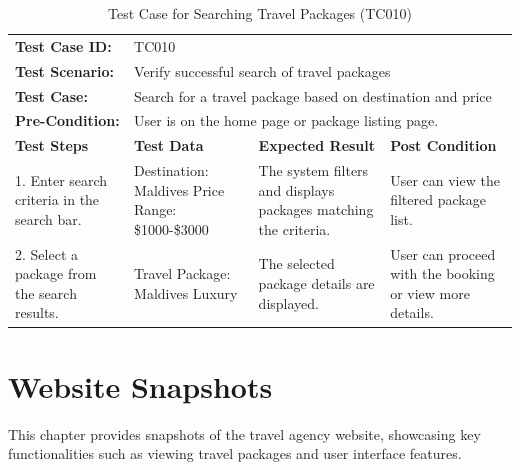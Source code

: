 \documentclass{scrreprt}
\begin{document}
    \begin{longtable}{| m{2cm} | m{5cm} | m{4cm} | m{3cm} |}
    \caption{Test Case for Searching Travel Packages (TC010)}
    \vspace{0.5cm} \\ \hline
    \textbf{Test Case ID:} & \multicolumn{3}{l|}{TC010} \\ \hline
    \textbf{Test Scenario:} & \multicolumn{3}{l|}{Verify successful search of travel packages} \\ \hline
    \textbf{Test Case:} & \multicolumn{3}{l|}{Search for a travel package based on destination and price} \\ \hline
    \textbf{Pre-Condition:} & \multicolumn{3}{l|}{User is on the home page or package listing page.} \\ \hline
    \textbf{Test Steps} & \textbf{Test Data} & \textbf{Expected Result} & \textbf{Post Condition} \\ \hline
    1. Enter search criteria in the search bar. & Destination: Maldives \newline Price Range: \$1000-\$3000 & The system filters and displays packages matching the criteria. & User can view the filtered package list. \\ \hline
    2. Select a package from the search results. & Travel Package: Maldives Luxury & The selected package details are displayed. & User can proceed with the booking or view more details. \\ \hline
    \end{longtable}

    \chapter{Website Snapshots}

    This chapter provides snapshots of the travel agency website, showcasing key functionalities such as viewing travel packages and user interface features.
    
\end{document}
